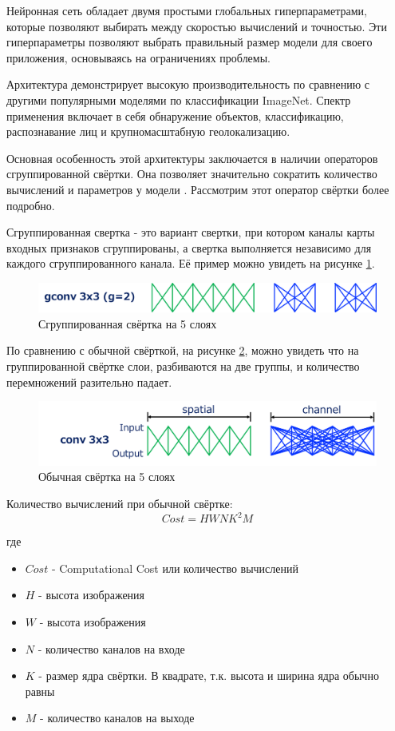 Нейронная сеть обладает двумя простыми глобальных гиперпараметрами, которые позволяют выбирать между скоростью вычислений и точностью. Эти гиперпараметры позволяют выбрать правильный размер модели для своего приложения, основываясь на ограничениях проблемы. 

Архитектура демонстрирует высокую производительность по сравнению с другими популярными моделями по классификации ImageNet. Спектр применения включает в себя обнаружение объектов, классификацию, распознавание лиц и крупномасштабную геолокализацию.\cite{mobilenet}

Основная особенность этой архитектуры заключается в наличии операторов сгруппированной свёртки. Она позволяет значительно сократить количество вычислений и параметров у модели \cite{xception}. Рассмотрим этот оператор свёртки более подробно.

Сгруппированная свертка - это вариант свертки, при котором каналы карты входных признаков сгруппированы, а свертка выполняется независимо для каждого сгруппированного канала. Её пример можно увидеть на рисунке \ref{fig:gconv}.

\begin{figure}[h]
    \centering
    \includegraphics[width=\textwidth*2/3]{images/gconv.png}
    \caption{Сгруппированная свёртка на 5 слоях}
    \label{fig:gconv}
\end{figure}

По сравнению с обычной свёрткой, на рисунке \ref{fig:normal_conv}, можно увидеть что на группированной свёртке слои, разбиваются на две группы, и количество перемножений разительно падает.

\begin{figure}[h]
    \centering
    \includegraphics[width=\textwidth*2/3]{images/normal_conv.png}
    \caption{Обычная свёртка на 5 слоях}
    \label{fig:normal_conv}
\end{figure}

Количество вычислений при обычной свёртке:
\[
    Cost = HWNK^2M
\]

где
\begin{itemize}
    \item $Cost$ - Computational Cost или количество вычислений
    \item $H$ - высота изображения
    \item $W$ - высота изображения
    \item $N$ - количество каналов на входе
    \item $K$ - размер ядра свёртки. В квадрате, т.к. высота и ширина ядра обычно равны
    \item $M$ - количество каналов на выходе
\end{itemize}

